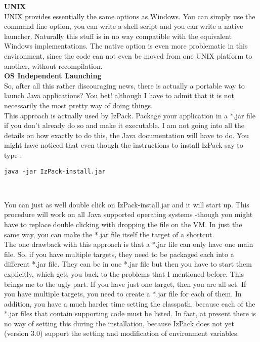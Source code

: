 \textbf{UNIX}\\

UNIX provides essentially the same options as Windows. You can simply
use the command line option, you can write a shell script and you can
write a native launcher. Naturally this stuff is in no way compatible
with the equivalent Windows implementations. The native option is even
more problematic in this environment, since the code can not even be
moved from one UNIX platform to another, without recompilation.\\

\textbf{OS Independent Launching}\\

So, after all this rather discouraging news, there is actually a
portable way to launch Java applications? You bet! although I have to
admit that it is not necessarily the most pretty way of doing things.\\

This approach is actually used by IzPack. Package your application in a
*.jar file if you don't already do so and make it executable. I am not
going into all the details on how exactly to do this, the Java
documentation will have to do. You might have noticed that even though
the instructions to install IzPack say to type :
\begin{verbatim}
java -jar IzPack-install.jar
\end{verbatim}\

You can just as well double click on IzPack-install.jar and it will
start up. This procedure will work on all Java supported operating
systems -though you might have to replace double clicking with dropping
the file on the VM. In just the same way, you can make the *.jar file
itself the target of a shortcut.\\

The one drawback with this approach is that a *.jar file can only have
one main file. So, if you have multiple targets, they need to be
packaged each into a different *.jar file. They can be in one *.jar file
but then you have to start them explicitly, which gets you back to the
problems that I mentioned before. This brings me to the ugly part. If
you have just one target, then you are all set. If you have multiple
targets, you need to create a *.jar file for each of them. In addition,
you have a much harder time setting the classpath, because each of the
*.jar files that contain supporting code must be listed. In fact, at
present there is no way of setting this during the installation, because
IzPack does not yet (version 3.0) support the setting and modification
of environment variables.\\

